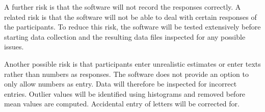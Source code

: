 \documentclass[a4paper,doc,natbib]{apa6}
\begin{document}
A further risk is that the software will not record the responses correctly. A related risk is that the software will not be able to deal with certain responses of the participants. To reduce this risk, the software will be tested extensively before starting data collection and the resulting data files inspected for any possible issues.

Another possible risk is that participants enter unrealistic estimates or enter texts rather than numbers as responses. The software does not provide an option to only allow numbers as entry. Data will therefore be inspected for incorrect entries. Outlier values will be identified using histograms and removed before mean values are computed. Accidental entry of letters will be corrected for.



\end{document}
